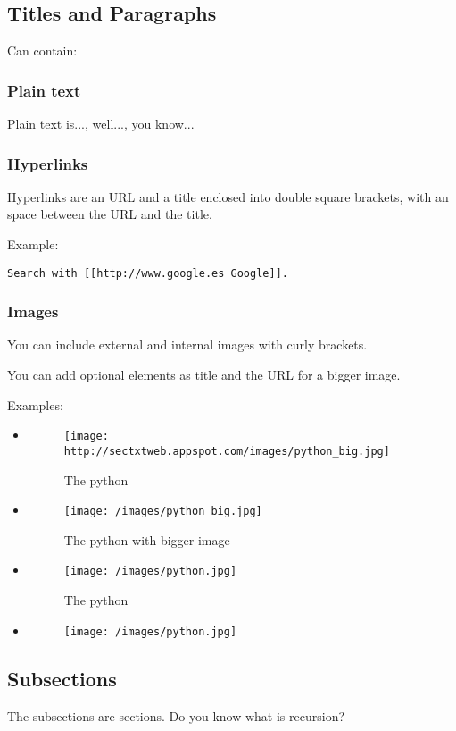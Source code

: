 \documentclass[a4paper,11pt]{article}
\begin{document}
\subsection{Titles and Paragraphs }
Can contain:

\subsubsection{Plain text}
Plain text is..., well..., you know...

\subsubsection{Hyperlinks}
Hyperlinks are an URL and a title enclosed into double square
brackets, with an space between the URL and the title.

Example:

\begin{verbatim}
Search with [[http://www.google.es Google]].
\end{verbatim}
\subsubsection{Images}
You can include external and internal images with curly brackets.	

You can add optional elements as title and the URL for a bigger image.

Examples: 

\begin{itemize}
\item  \begin{figure}[ht!]
		\centering
		\texttt{[image: http://sectxtweb.appspot.com/images/python\_big.jpg]}
		\caption{The python}
		\label{overflow}
		\end{figure}
		 
\item  \begin{figure}[ht!]
		\centering
		\texttt{[image: /images/python\_big.jpg]}
		\caption{The python with bigger image}
		\label{overflow}
		\end{figure}
		 
\item  \begin{figure}[ht!]
		\centering
		\texttt{[image: /images/python.jpg]}
		\caption{The python}
		\label{overflow}
		\end{figure}
		 
\item  \begin{figure}[ht!]
		\centering
		\texttt{[image: /images/python.jpg]}
		\label{overflow}
		\end{figure}
		
\end{itemize}
\subsection{Subsections}
The subsections are sections. Do you know what is recursion?
\end{document}
